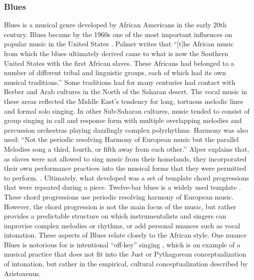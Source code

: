 \subsubsection{Blues}
Blues is a musical genre developed by African Americans in the early 20th century. Blues became by the 1960s one of the most important influences on popular music in the United States \cite{blues}. Palmer writes that ``[t]he African music from which the blues ultimately derived came to what is now the Southern United States with the first African slaves. These Africans had belonged to a number of different tribal and linguistic groups, each of which had its own musical traditions.’’ \cite[][p.~25]{palmer1981deep} Some traditions had for many centuries had contact with Berber and Arab cultures in the North of the Saharan desert. The vocal music in these areas reflected the Middle East’s tendency for long, tortuous melodic lines and formal solo singing. In other Sub-Saharan cultures, music tended to consist of group singing in call and response form with multiple overlapping melodies and percussion orchestras playing dazzlingly complex polyrhythms. Harmony was also used: ``Not the periodic resolving Harmony of European music but the parallel Melodies song a third, fourth, or fifth away from each other.’’ \cite[][p.~27]{palmer1981deep} Alper explains that, as slaves were not allowed to sing music from their homelands, they incorporated their own performance practices into the musical forms that they were permitted to perform. \cite{alper2005flexibility}. Ultimately, what developed was a set of template chord progressions that were repeated during a piece. Twelve-bar blues is a widely used template \cite{alper2005flexibility}. These chord progressions use periodic resolving harmony of European music. However, the chord progression is not the main focus of the music, but rather provides a predictable structure on which instrumentalists and singers can improvise complex melodies or rhythms, or add personal nuances such as vocal intonation. These aspects of Blues relate closely to the African style. One nuance Blues is notorious for is intentional ``off-key'' singing \cite{autotuneBritannica}, which is an example of a musical practice that does not fit into the Just or Pythagorean conceptualization of intonation, but rather in the empirical, cultural conceptualization described by Aristoxenus.

